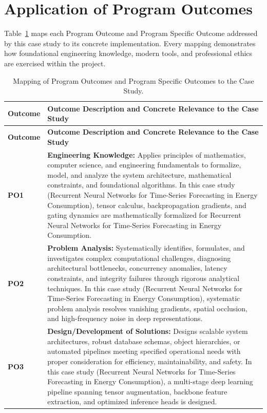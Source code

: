 \section{Application of Program Outcomes}
Table~\ref{tab:po} maps each Program Outcome and Program Specific Outcome addressed by this case study to its concrete implementation. Every mapping demonstrates how foundational engineering knowledge, modern tools, and professional ethics are exercised within the project.

{\small
\begin{longtable}{@{}>{\centering\arraybackslash}p{1.8cm} p{13.2cm}@{}}
    \caption{Mapping of Program Outcomes and Program Specific Outcomes to the Case Study.}\label{tab:po}\\
    \toprule
    \textbf{Outcome} & \textbf{Outcome Description and Concrete Relevance to the Case Study} \\
    \midrule
    \endfirsthead
    \toprule
    \textbf{Outcome} & \textbf{Outcome Description and Concrete Relevance to the Case Study} \\
    \midrule
    \endhead
\textbf{PO1} & \textbf{Engineering Knowledge:} Applies principles of mathematics, computer science, and engineering fundamentals to formalize, model, and analyze the system architecture, mathematical constraints, and foundational algorithms. In this case study (Recurrent Neural Networks for Time-Series Forecasting in Energy Consumption), tensor calculus, backpropagation gradients, and gating dynamics are mathematically formalized for Recurrent Neural Networks for Time-Series Forecasting in Energy Consumption. \\
    \addlinespace
\textbf{PO2} & \textbf{Problem Analysis:} Systematically identifies, formulates, and investigates complex computational challenges, diagnosing architectural bottlenecks, concurrency anomalies, latency constraints, and integrity failures through rigorous analytical techniques. In this case study (Recurrent Neural Networks for Time-Series Forecasting in Energy Consumption), systematic problem analysis resolves vanishing gradients, spatial occlusion, and high-frequency noise in deep representations. \\
    \addlinespace
\textbf{PO3} & \textbf{Design/Development of Solutions:} Designs scalable system architectures, robust database schemas, object hierarchies, or automated pipelines meeting specified operational needs with proper consideration for efficiency, maintainability, and safety. In this case study (Recurrent Neural Networks for Time-Series Forecasting in Energy Consumption), a multi-stage deep learning pipeline spanning tensor augmentation, backbone feature extraction, and optimized inference heads is designed. \\

\end{longtable}}
